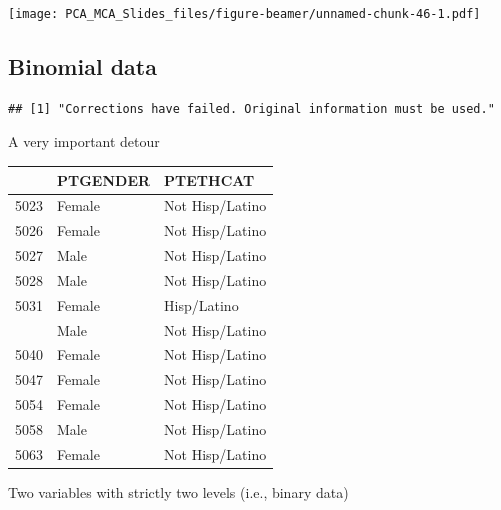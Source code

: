 \documentclass[
  ignorenonframetext,
]{beamer}
\begin{document}
\begin{frame}

\texttt{[image: PCA\_MCA\_Slides\_files/figure-beamer/unnamed-chunk-46-1.pdf]}

\end{frame}

\hypertarget{binomial-data}{%
\subsection{Binomial data}\label{binomial-data}}

\begin{verbatim}
## [1] "Corrections have failed. Original information must be used."
\end{verbatim}

\begin{frame}{A very important detour}
\protect\hypertarget{a-very-important-detour}{}

\begin{table}[H]
\centering\begingroup\fontsize{7}{9}\selectfont

\begin{tabular}{lll}
\toprule
  & PTGENDER & PTETHCAT\\
\midrule
5023 & Female & Not Hisp/Latino\\
5026 & Female & Not Hisp/Latino\\
5027 & Male & Not Hisp/Latino\\
5028 & Male & Not Hisp/Latino\\
5031 & Female & Hisp/Latino\\
\addlinespace
5037 & Male & Not Hisp/Latino\\
5040 & Female & Not Hisp/Latino\\
5047 & Female & Not Hisp/Latino\\
5054 & Female & Not Hisp/Latino\\
5058 & Male & Not Hisp/Latino\\
5063 & Female & Not Hisp/Latino\\
\bottomrule
\end{tabular}\endgroup{}
\end{table}

\begin{center}Two variables with strictly two levels (i.e., binary data)\end{center}

\end{frame}
\end{document}
